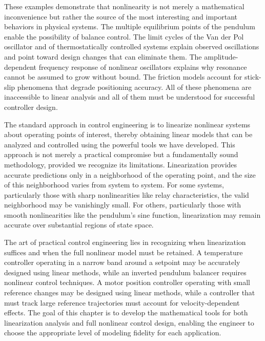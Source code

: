 These examples demonstrate that nonlinearity is not merely a mathematical inconvenience but rather the source of the most interesting and important behaviors in physical systems. The multiple equilibrium points of the pendulum enable the possibility of balance control. The limit cycles of the Van der Pol oscillator and of thermostatically controlled systems explain observed oscillations and point toward design changes that can eliminate them. The amplitude-dependent frequency response of nonlinear oscillators explains why resonance cannot be assumed to grow without bound. The friction models account for stick-slip phenomena that degrade positioning accuracy. All of these phenomena are inaccessible to linear analysis and all of them must be understood for successful controller design.

The standard approach in control engineering is to linearize nonlinear systems about operating points of interest, thereby obtaining linear models that can be analyzed and controlled using the powerful tools we have developed. This approach is not merely a practical compromise but a fundamentally sound methodology, provided we recognize its limitations. Linearization provides accurate predictions only in a neighborhood of the operating point, and the size of this neighborhood varies from system to system. For some systems, particularly those with sharp nonlinearities like relay characteristics, the valid neighborhood may be vanishingly small. For others, particularly those with smooth nonlinearities like the pendulum's sine function, linearization may remain accurate over substantial regions of state space.

The art of practical control engineering lies in recognizing when linearization suffices and when the full nonlinear model must be retained. A temperature controller operating in a narrow band around a setpoint may be accurately designed using linear methods, while an inverted pendulum balancer requires nonlinear control techniques. A motor position controller operating with small reference changes may be designed using linear methods, while a controller that must track large reference trajectories must account for velocity-dependent effects. The goal of this chapter is to develop the mathematical tools for both linearization analysis and full nonlinear control design, enabling the engineer to choose the appropriate level of modeling fidelity for each application.
